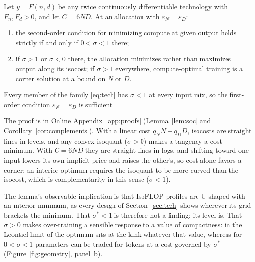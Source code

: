 \begin{lemma}\label{lemma:sigma}
Let $y=F(n,d)$ be any twice continuously differentiable technology with $F_n,F_d>0$, and let $C=6ND$. At an allocation
with $\varepsilon_N=\varepsilon_D$:
\begin{enumerate}
\item[(i)] the second-order condition for minimizing compute at given output holds strictly if and only if $0<\sigma<1$
there;
\item[(ii)] if $\sigma>1$ or $\sigma<0$ there, the allocation minimizes rather than maximizes output along its isocost;
if $\sigma>1$ everywhere, compute-optimal training is a corner solution at a bound on $N$ or $D$.
\end{enumerate}
Every member of the family \eqref{eq:tech} has $\sigma<1$ at every input mix, so the first-order condition
$\varepsilon_N=\varepsilon_D$ is sufficient.
\end{lemma}

\noindent The proof is in Online Appendix~\ref{app:proofs} (Lemma~\ref{lem:soc} and Corollary~\ref{cor:complements}).
With a linear cost $q_NN+q_DD$, isocosts are straight lines in levels, and any convex isoquant ($\sigma>0$) makes a
tangency a cost minimum. With $C=6ND$ they are straight lines in logs, and shifting toward one input lowers its own implicit price and
raises the other's, so cost alone favors a corner; an interior optimum requires the isoquant to be more curved than the
isocost, which is complementarity in this sense ($\sigma<1$).

The lemma's observable implication is that IsoFLOP profiles are U-shaped with an
interior minimum, as every design of Section~\ref{sec:tech} shows wherever its grid brackets the minimum. That
$\sigma^*<1$ is therefore not a finding; its level is. That $\sigma>0$ makes over-training a sensible response to a
value of compactness: in the Leontief limit of \citet{hao2026theory} the optimum sits at the kink whatever that value, whereas for $0<\sigma<1$ parameters can be traded for tokens at a cost governed by
$\sigma^*$ (Figure~\ref{fig:geometry}, panel~b).

